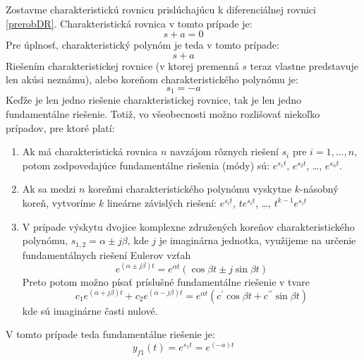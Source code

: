 \documentclass[a4paper, 10pt, ]{article}
\begin{document}
Zostavme charakteristickú rovnicu prislúchajúcu k diferenciálnej rovnici \eqref{prerobDR}. Charakteristická rovnica v tomto prípade je:
\begin{equation}
    s + a = 0
\end{equation}
Pre úplnosť, charakteristický polynóm je teda v tomto prípade:
\begin{equation}
    s + a
\end{equation}
Riešením charakteristickej rovnice (v ktorej premenná $s$ teraz vlastne predstavuje len akúsi neznámu), alebo koreňom charakteristického polynómu je:
\begin{equation}
    s_1 = -a
\end{equation}
Keďže je len jedno riešenie charakteristickej rovnice, tak je len jedno fundamentálne riešenie. Totiž, vo všeobecnosti možno rozlišovať niekoľko prípadov, pre ktoré platí:
\begin{enumerate}[leftmargin=0pt, labelsep=4mm, itemsep=0pt]
    \item Ak má charakteristická rovnica $n$ navzájom rôznych riešení $s_i$ pre $i = 1, \ldots, n$, potom zodpovedajúce fundamentálne riešenia (módy) sú: $e^{s_1 t}$, $e^{s_2 t}$, \ldots, $e^{s_n t}$.
    \item Ak sa medzi $n$ koreňmi charakteristického polynómu vyskytne $k$-násobný koreň, vytvoríme $k$ lineárne závislých riešení: $e^{s_i t}$, $t e^{s_i t}$, \ldots, $t^{k-1} e^{s_i t}$
    \item V prípade výskytu dvojice komplexne združených koreňov charakteristického polynómu, $s_{1,2} = \alpha \pm j \beta$, kde $j$ je imaginárna jednotka, využijeme na určenie fundamentálnych riešení Eulerov vzťah
    \begin{equation}
        e^{\left(\alpha \pm j \beta\right)t} = e^{\alpha t} \left( \cos\beta t \pm j \sin \beta t\right)
    \end{equation}
    Preto potom možno písať príslušné fundamentálne riešenie v tvare
    \begin{equation}
        c_1 e^{\left(\alpha + j \beta\right)t} + c_2 e^{\left(\alpha - j \beta\right)t} = e^{\alpha t} \left( c^\prime \cos\beta t + c^{\prime\prime} \sin \beta t\right)
    \end{equation}
    kde sú imaginárne časti nulové.
\end{enumerate}



 V tomto prípade teda fundamentálne riešenie je:
 \begin{equation}
      y_{f1}(t) = e^{s_1 t} = e^{(-a) t}
 \end{equation}
\end{document}
